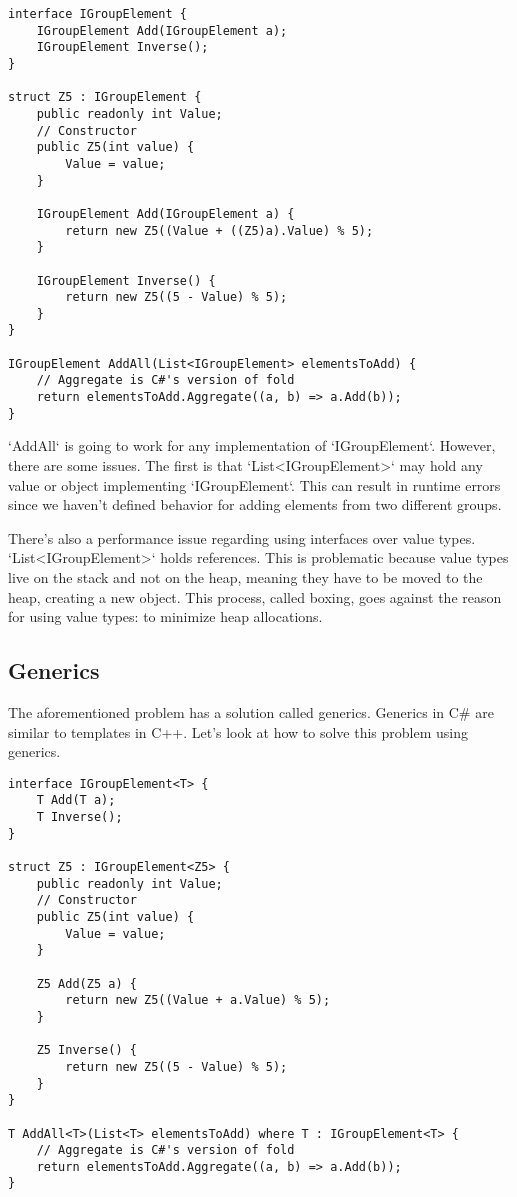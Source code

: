 \begin{lstlisting}
interface IGroupElement {
    IGroupElement Add(IGroupElement a);
    IGroupElement Inverse();
}

struct Z5 : IGroupElement {
    public readonly int Value;
    // Constructor
    public Z5(int value) {
        Value = value;
    }

    IGroupElement Add(IGroupElement a) {
        return new Z5((Value + ((Z5)a).Value) % 5);
    }

    IGroupElement Inverse() {
        return new Z5((5 - Value) % 5);
    }
}

IGroupElement AddAll(List<IGroupElement> elementsToAdd) {
    // Aggregate is C#'s version of fold
    return elementsToAdd.Aggregate((a, b) => a.Add(b));
}
\end{lstlisting}

`AddAll` is going to work for any implementation of `IGroupElement`. However, there are some issues. The first is that `List<IGroupElement>` may hold any value or object implementing `IGroupElement`. This can result in runtime errors since we haven't defined behavior for adding elements from two different groups.

There's also a performance issue regarding using interfaces over value types. `List<IGroupElement>` holds references. This is problematic because value types live on the stack and not on the heap, meaning they have to be moved to the heap, creating a new object. This process, called boxing, goes against the reason for using value types: to minimize heap allocations.

\subsection{Generics}
The aforementioned problem has a solution called generics. Generics in C\# are similar to templates in C++. Let's look at how to solve this problem using generics.

\begin{lstlisting}
interface IGroupElement<T> {
    T Add(T a);
    T Inverse();
}

struct Z5 : IGroupElement<Z5> {
    public readonly int Value;
    // Constructor
    public Z5(int value) {
        Value = value;
    }

    Z5 Add(Z5 a) {
        return new Z5((Value + a.Value) % 5);
    }

    Z5 Inverse() {
        return new Z5((5 - Value) % 5);
    }
}

T AddAll<T>(List<T> elementsToAdd) where T : IGroupElement<T> {
    // Aggregate is C#'s version of fold
    return elementsToAdd.Aggregate((a, b) => a.Add(b));
}
\end{lstlisting}

